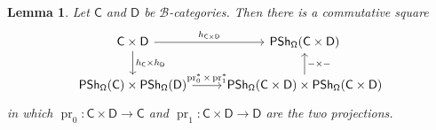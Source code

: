 \documentclass[reqno]{amsart}
\numberwithin{equation}{subsection}
\theoremstyle{plain}
\newtheorem{lemma}[equation]{Lemma}
\theoremstyle{definition}
\let\scr=\mathcal
\def\BB{\scr B}
\DeclareMathOperator{\IPSh}{\mathsf{PSh}}
\DeclareMathOperator{\pr}{pr}
\newcommand{\I}[1]{\mathsf{#1}}
\begin{document}
\begin{lemma}
	\label{lem:YonedaEmbeddingProduct}
	Let $\I{C}$ and $\I{D}$ be $\BB$-categories. Then there is a commutative square
	\begin{equation*}
	\begin{tikzcd}
	\I{C}\times\I{D}\arrow[r, "h_{\I{C}\times\I{D}}"]\arrow[d, "h_{\I{C}}\times h_{\I{D}}"] & \IPSh_{\Univ}(\I{C}\times\I{D})\\
	\IPSh_{\Univ}(\I{C})\times\IPSh_{\Univ}(\I{D})\arrow[r, "\pr_0^\ast\times\pr_1^\ast"] & \IPSh_{\Univ}(\I{C}\times\I{D})\times\IPSh_{\Univ}(\I{C}\times\I{D})\arrow[u, "-\times-"']
	\end{tikzcd}
	\end{equation*}
	in which $\pr_0\colon \I{C}\times\I{D}\to\I{C}$ and $\pr_1\colon\I{C}\times\I{D}\to\I{D}$ are the two projections.
\end{lemma}
\end{document}
